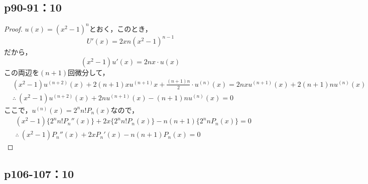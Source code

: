 \documentclass[uplatex,dvipdfmx,a4paper,10pt,fleqn]{jsarticle}
\begin{document}
\subsection*{p90-91：10}

\begin{tleftbar}
    \begin{proof}
    $u(x)= (x^2-1)^n$とおく，このとき，
    \[
     U'(x)= 2x n(x^2-1)^{n-1}
    \]
    だから，
    \[
        (x^2-1) u'(x)=2nx \cdot u(x)
    \]
    この両辺を$(n+1)$回微分して，
    \begin{align*}
       & (x^2-1)u^{(n+2)}(x)+2(n+1)x u^{(n+1)} x + \frac{(n+1)n}{2} \cdot u^{(n)} (x) = 2nx u^{(n+1)}(x) + 2(n+1) n u^{(n)}(x) \\
       & \therefore ~(x^2-1)u^{(n+2)}(x) + 2n u^{(n+1)}(x)-(n+1)n u^{(n)}(x)=0
    \end{align*}
    ここで，$ u^{(n)} (x)= 2^n n! P_n (x)$なので，
    \begin{align*} 
        & (x^2 -1) \{ 2^n n! P_n ''(x) \} +2x \{ 2^n n! P_n (x) \} -n(n+1) \{ 2^n n P_n(x) \} =0 \\
      &   \therefore ~ (x^2-1) P_n ''(x)+2x P_n '(x) -n(n+1) P_n (x)=0
    \end{align*}
\end{proof}
\end{tleftbar}


\subsection*{p106-107：10}
\end{document}
